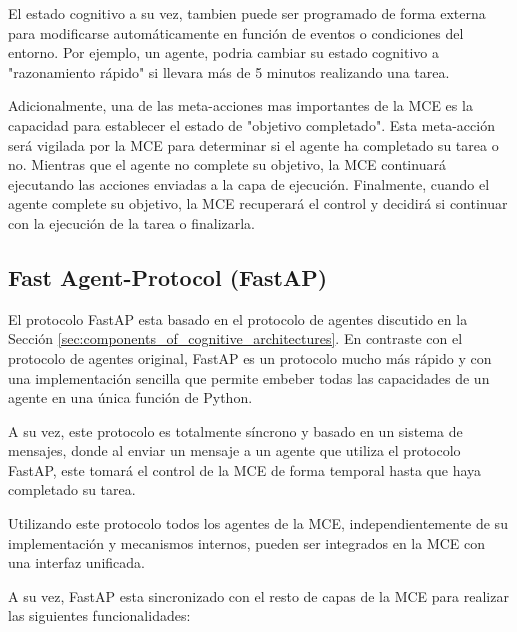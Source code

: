 El estado cognitivo a su vez, tambien puede ser programado de forma externa para 
modificarse automáticamente en función de eventos o condiciones del entorno. Por ejemplo,
un agente, podria cambiar su estado cognitivo a "razonamiento rápido" si llevara 
más de 5 minutos realizando una tarea.

Adicionalmente, una de las meta-acciones mas importantes de la MCE es la capacidad para establecer
el estado de "objetivo completado". Esta meta-acción será vigilada por la MCE para determinar si
el agente ha completado su tarea o no. Mientras que el agente no complete su objetivo, la MCE continuará
ejecutando las acciones enviadas a la capa de ejecución. Finalmente, cuando el agente complete su objetivo,
la MCE recuperará el control y decidirá si continuar con la ejecución de la tarea o finalizarla.

\subsection{Fast Agent-Protocol (FastAP)}
El protocolo FastAP esta basado en el protocolo de agentes discutido en la Sección 
\ref{sec:components_of_cognitive_architectures}. En contraste con el protocolo de agentes
original, FastAP es un protocolo mucho más rápido y con una implementación sencilla que permite
embeber todas las capacidades de un agente en una única función de Python.

A su vez, este protocolo es totalmente síncrono y basado en un sistema de mensajes, donde
al enviar un mensaje a un agente que utiliza el protocolo FastAP, este tomará el control
de la MCE de forma temporal hasta que haya completado su tarea.

Utilizando este protocolo todos los agentes de la MCE, independientemente de su implementación
y mecanismos internos, pueden ser integrados en la MCE con una interfaz unificada.

A su vez, FastAP esta sincronizado con el resto de capas de la MCE para realizar las 
siguientes funcionalidades:

